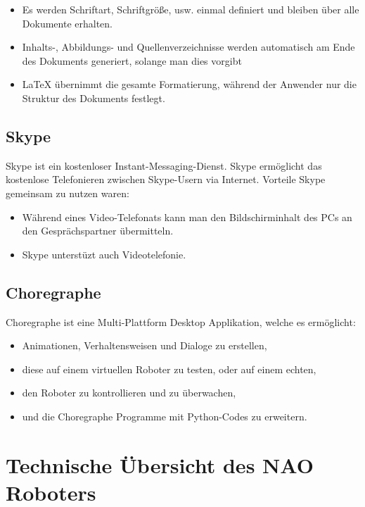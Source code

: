 \documentclass[12pt]{article}  %
\begin{document}
		\begin{itemize}
			\item Es werden Schriftart, Schriftgröße, usw. einmal definiert und bleiben 	
			über alle Dokumente erhalten.
			
			\item Inhalts-, Abbildungs- und Quellenverzeichnisse werden automatisch am 
			Ende des Dokuments generiert, solange man dies vorgibt
			
			\item LaTeX übernimmt die gesamte Formatierung, während der Anwender nur die 
			Struktur des Dokuments festlegt.
		\end{itemize}
	
	
	\subsection{Skype}
		Skype ist ein kostenloser Instant-Messaging-Dienst. Skype ermöglicht das 
		kostenlose Telefonieren zwischen Skype-Usern via Internet.\newline
		Vorteile Skype gemeinsam zu nutzen waren:
		\begin{itemize}
			\item Während eines Video-Telefonats kann man den Bildschirminhalt des PCs an 
			den Gesprächspartner übermitteln.
			\item Skype unterstüzt auch Videotelefonie.
		\end{itemize}				
		
	\subsection{Choregraphe}
		Choregraphe ist eine Multi-Plattform Desktop Applikation, welche es ermöglicht:
			\begin{itemize}
				\item Animationen, Verhaltensweisen und Dialoge zu erstellen,
				\item diese auf einem virtuellen Roboter zu testen, oder auf einem echten,
				\item den Roboter zu kontrollieren und zu überwachen,
				\item und die Choregraphe Programme mit Python-Codes zu erweitern.
			\end{itemize}

\section{Technische Übersicht des NAO Roboters}
\end{document}
